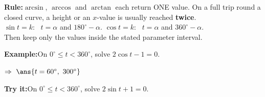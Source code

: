 \documentclass[12pt]{article}
\begin{document}
\begin{formulabox}\textbf{Rule:}\quad $\arcsin$, $\arccos$ and $\arctan$ each return ONE value.
On a full trip round a closed curve, a height or an $x$-value is usually reached \textbf{twice}.
\\[3pt]
$\sin t = k$: \ $t = \alpha$ and $180^\circ - \alpha$. \qquad
$\cos t = k$: \ $t = \alpha$ and $360^\circ - \alpha$. \\
Then keep only the values inside the stated parameter interval.
\end{formulabox}
\begin{examplebox}\textbf{Example:}\quad On $0^\circ \le t < 360^\circ$, solve
$2\cos t - 1 = 0$.
\par\noindent$\Rightarrow\ \ans{t = 60^\circ,\ 300^\circ}$
\end{examplebox}
\begin{tryitbox}\textbf{Try it:}\quad On $0^\circ \le t < 360^\circ$, solve
$2\sin t + 1 = 0$.\\[2pt]
\end{tryitbox}
\end{document}
